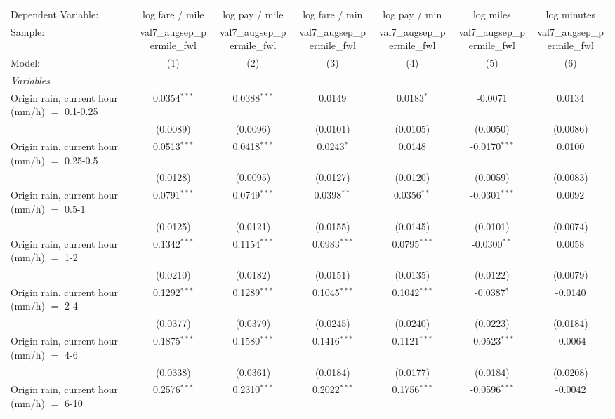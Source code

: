 \ifdefined\ifclassloaded
{}
\fi
\begingroup
\centering
\begin{tabular}{lcccccc}
   \tabularnewline \midrule \midrule
   Dependent Variable: & log fare / mile & log pay / mile & log fare / min & log pay / min & log miles & log minutes\\
   Sample: & val7\_augsep\_permile\_fwl & val7\_augsep\_permile\_fwl & val7\_augsep\_permile\_fwl & val7\_augsep\_permile\_fwl & val7\_augsep\_permile\_fwl & val7\_augsep\_permile\_fwl \\
   Model: & (1) & (2) & (3) & (4) & (5) & (6)\\
   \midrule
   \emph{Variables}\\
   Origin rain, current hour (mm/h) $=$ 0.1-0.25 & 0.0354$^{***}$ & 0.0388$^{***}$ & 0.0149 & 0.0183$^{*}$ & -0.0071 & 0.0134\\
    & (0.0089) & (0.0096) & (0.0101) & (0.0105) & (0.0050) & (0.0086)\\
   Origin rain, current hour (mm/h) $=$ 0.25-0.5 & 0.0513$^{***}$ & 0.0418$^{***}$ & 0.0243$^{*}$ & 0.0148 & -0.0170$^{***}$ & 0.0100\\
    & (0.0128) & (0.0095) & (0.0127) & (0.0120) & (0.0059) & (0.0083)\\
   Origin rain, current hour (mm/h) $=$ 0.5-1 & 0.0791$^{***}$ & 0.0749$^{***}$ & 0.0398$^{**}$ & 0.0356$^{**}$ & -0.0301$^{***}$ & 0.0092\\
    & (0.0125) & (0.0121) & (0.0155) & (0.0145) & (0.0101) & (0.0074)\\
   Origin rain, current hour (mm/h) $=$ 1-2 & 0.1342$^{***}$ & 0.1154$^{***}$ & 0.0983$^{***}$ & 0.0795$^{***}$ & -0.0300$^{**}$ & 0.0058\\
    & (0.0210) & (0.0182) & (0.0151) & (0.0135) & (0.0122) & (0.0079)\\
   Origin rain, current hour (mm/h) $=$ 2-4 & 0.1292$^{***}$ & 0.1289$^{***}$ & 0.1045$^{***}$ & 0.1042$^{***}$ & -0.0387$^{*}$ & -0.0140\\
    & (0.0377) & (0.0379) & (0.0245) & (0.0240) & (0.0223) & (0.0184)\\
   Origin rain, current hour (mm/h) $=$ 4-6 & 0.1875$^{***}$ & 0.1580$^{***}$ & 0.1416$^{***}$ & 0.1121$^{***}$ & -0.0523$^{***}$ & -0.0064\\
    & (0.0338) & (0.0361) & (0.0184) & (0.0177) & (0.0184) & (0.0208)\\
   Origin rain, current hour (mm/h) $=$ 6-10 & 0.2576$^{***}$ & 0.2310$^{***}$ & 0.2022$^{***}$ & 0.1756$^{***}$ & -0.0596$^{***}$ & -0.0042\\

\end{tabular}
